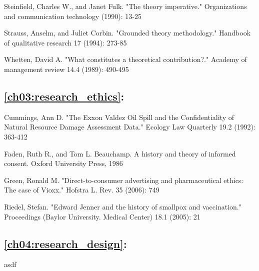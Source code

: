 \begin{description}
	\item Steinfield, Charles W., and Janet Fulk. "The theory imperative." Organizations and communication technology (1990): 13-25

	\item Strauss, Anselm, and Juliet Corbin. "Grounded theory methodology." Handbook of qualitative research 17 (1994): 273-85

	\item Whetten, David A. "What constitutes a theoretical contribution?." Academy of management review 14.4 (1989): 490-495

\end{description}

\subsection*{\ref{ch03:research_ethics}: }

\begin{description}

	\item Cummings, Ann D. "The Exxon Valdez Oil Spill and the Confidentiality of Natural Resource Damage Assessment Data." Ecology Law Quarterly 19.2 (1992): 363-412
	
	\item Faden, Ruth R., and Tom L. Beauchamp. A history and theory of informed consent. Oxford University Press, 1986

	\item Green, Ronald M. "Direct-to-consumer advertising and pharmaceutical ethics: The case of Vioxx." Hofstra L. Rev. 35 (2006): 749
	
	\item Riedel, Stefan. "Edward Jenner and the history of smallpox and vaccination." Proceedings (Baylor University. Medical Center) 18.1 (2005): 21

\end{description}

\subsection*{\ref{ch04:research_design}: }

asdf










